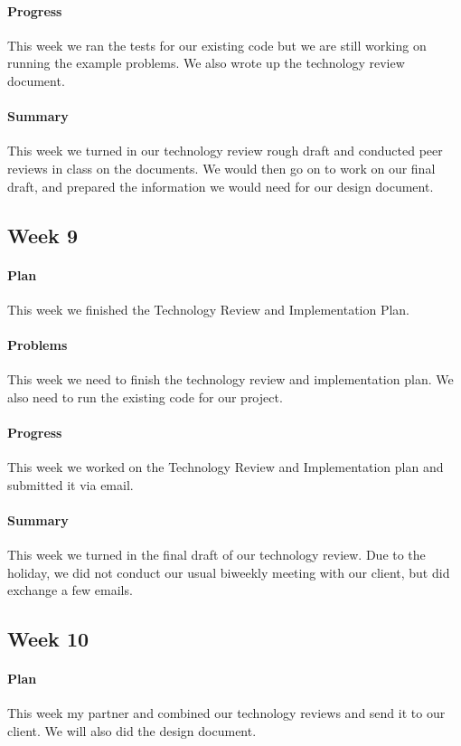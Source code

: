 \documentclass[onecolumn, draftclsnofoot,10pt, compsoc]{IEEEtran}
\begin{document}
\paragraph{Progress}
This week we ran the tests for our existing code but we are still working on running the example problems. We also wrote up the technology review document.
\paragraph{Summary}
This week we turned in our technology review rough draft and conducted peer reviews in class on the documents. We would then go on to work on our final draft, and prepared the information we would need for our design document.

\subsection{Week 9}
\paragraph{Plan}
This week we finished the Technology Review and Implementation Plan.
\paragraph{Problems}
This week we need to finish the technology review and implementation plan. We also need to run the existing code for our project.
\paragraph{Progress}
This week we worked on the Technology Review and Implementation plan and submitted it via email.
\paragraph{Summary}
This week we turned in the final draft of our technology review. Due to the holiday, we did not conduct our usual biweekly meeting with our client, but did exchange a few emails.

\subsection{Week 10}
\paragraph{Plan}
This week my partner and combined our technology reviews and send it to our client. We will also did the design document.
\end{document}
